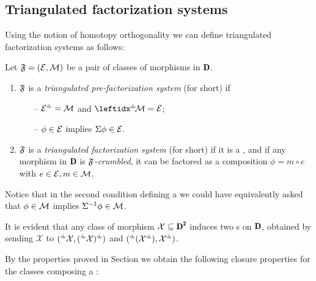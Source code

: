 \subsection{Triangulated factorization systems}
Using the notion of homotopy orthogonality we can define triangulated factorization systems as follows:
\begin{definition}\label{the_def_of_hfs}
Let $\mathfrak{F}=(\mathcal{E},\mathcal{M})$ be a pair of classes of morphisms in $\cD$.
\begin{enumerate}
\item $\mathfrak{F}$ is a \emph{triangulated pre-factorization system} (\phfs for short) if
\begin{enumerate}
\item[\rm --] $\E^{ \horth }=\M$ and $\lhorth{\!\M}=\E$;
\item[\rm --] $\phi\in \mathcal{E}$ implies $\Sigma\phi\in \mathcal{E}$.
\end{enumerate}
\item $\mathfrak{F}$ is a \emph{triangulated factorization system} (\hfs for short) if it is a \phfs, and if any morphism in $\cD$ is \emph{$\mathfrak{F}$-crumbled}, \ie it can be factored as a composition $\phi=m\circ e$ with $e\in\mathcal{E}, m\in\mathcal{M}$.
\end{enumerate}
\end{definition}
Notice that in the second condition defining a \phfs we could have equivalently asked that $\phi\in\mathcal{M}$ implies $\Sigma^{-1}\phi\in\mathcal{M}$.
\begin{remark}
It is evident %
that any class of morphism $\mathcal{X}\subseteq \cD^\due$ induces two {\phfs}s on $\cD$, obtained by sending $\mathcal{X}$ to $({}^{\horth} \mathcal{X}, ({}^{\horth}\mathcal{X})^{\horth})$ and $({}^{\horth}(\mathcal{X}^{\horth}),\mathcal{X}^{\horth})$. %
\end{remark}

By the properties proved in Section  we obtain the following closure properties for the classes composing a \phfs:

